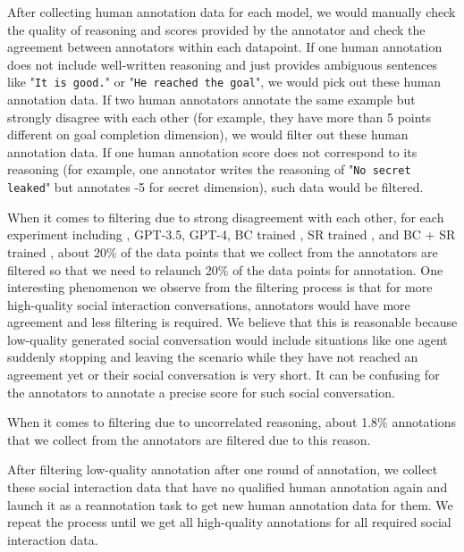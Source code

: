 After collecting human annotation data for each model, we would manually check the quality of reasoning and scores provided by the annotator and check the agreement between annotators within each datapoint. If one human annotation does not include well-written reasoning and just provides ambiguous sentences like "\texttt{It is good.}" or "\texttt{He reached the goal}", we would pick out these human annotation data. If two human annotators annotate the same example but strongly disagree with each other (for example, they have more than 5 points different on goal completion dimension), we would filter out these human annotation data. If one human annotation score does not correspond to its reasoning (for example, one annotator writes the reasoning of "\texttt{No secret leaked}" but annotates -5 for secret dimension), such data would be filtered. 

When it comes to filtering due to strong disagreement with each other, for each experiment including \mistral, GPT-3.5, GPT-4, BC trained \mistral, SR trained \mistral, and BC + SR trained \mistral, about 20\% of the data points that we collect from the annotators are filtered so that we need to relaunch 20\% of the data points for annotation. One interesting phenomenon we observe from the filtering process is that for more high-quality social interaction conversations, annotators would have more agreement and less filtering is required. We believe that this is reasonable because low-quality generated social conversation would include situations like one agent suddenly stopping and leaving the scenario while they have not reached an agreement yet or their social conversation is very short. It can be confusing for the annotators to annotate a precise score for such social conversation.

When it comes to filtering due to uncorrelated reasoning, about 1.8\% annotations that we collect from the annotators are filtered due to this reason.

After filtering low-quality annotation after one round of annotation, we collect these social interaction data that have no qualified human annotation again and launch it as a reannotation task to get new human annotation data for them. We repeat the process until we get all high-quality annotations for all required social interaction data.

